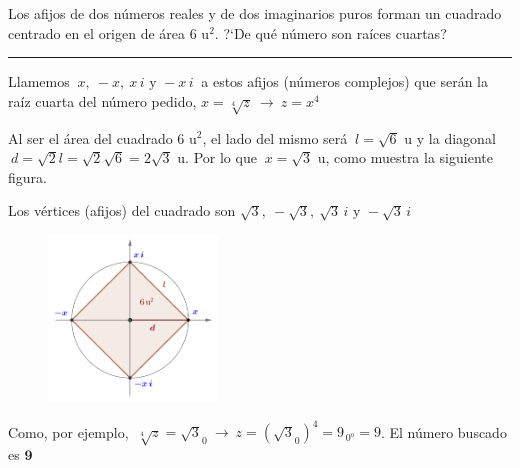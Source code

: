 \begin{miejercicio}

Los afijos de dos números reales y de dos imaginarios puros forman un cuadrado centrado en el origen de área 6 u$^2$. ?`De qué número son raíces cuartas?

\rule{250pt}{0.5pt}


\begin{multicols}{2}
Llamemos $\ x,\ -x,\ x\, i \text{ y } -x\, i \ $ a estos afijos (números complejos) que serán la raíz cuarta del número pedido, $x=\sqrt[4]{z} \ \to \ z=x^4$

\vspace{2mm}Al ser el área del cuadrado 6 u$^2$, el lado del mismo será $\ l=\sqrt{6}$ u y la diagonal $\ d=\sqrt{2} l = \sqrt{2} \sqrt{6} = 2\sqrt{3}$ u. Por lo que $\ x=\sqrt{3}$ u, como muestra la siguiente figura.

\vspace{2mm} Los vértices (afijos) del cuadrado son $\sqrt{3},\ -\sqrt{3},\ \sqrt{3}\, i  \text{ y } -\sqrt{3}\, i$
\begin{figure}[H]
	\centering
	\includegraphics[width=0.4\textwidth]{img-c/comp15.png}
\end{figure}	
\end{multicols}

\vspace{2mm} Como, por ejemplo, $\ \sqrt[4]{z}=\sqrt{3}_{0} \ \to \ z=(\sqrt{3}_{0})^4=9_{\, 0^o}= 9$. El número buscado es $\boldsymbol 9$

\end{miejercicio}


